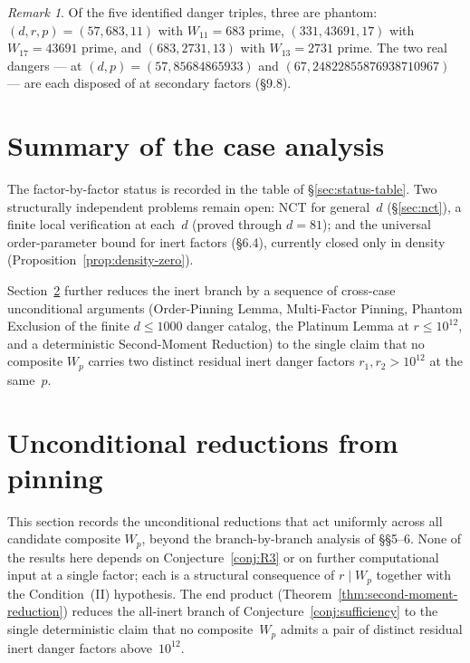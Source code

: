 \documentclass[12pt]{article}
\theoremstyle{plain}
\theoremstyle{definition}
\theoremstyle{remark}
\newtheorem{remark}[theorem]{Remark}
\begin{document}
\begin{remark}\label{rem:phantom-structure}
Of the five identified danger triples, three are phantom:
\((d, r, p) = (57, 683, 11)\) with \(W_{11} = 683\) prime,
\((331, 43691, 17)\) with \(W_{17} = 43691\) prime, and
\((683, 2731, 13)\) with \(W_{13} = 2731\) prime. The two real
dangers --- at \((d, p) = (57, 85684865933)\) and
\((67, 24822855876938710967)\) --- are each disposed of at
secondary factors (\S9.8).
\end{remark}


\section{Summary of the case analysis}


The factor-by-factor status is recorded in the table of
\S\ref{sec:status-table}. Two structurally independent problems
remain open: NCT for general~\(d\) (\S\ref{sec:nct}), a finite
local verification at each~\(d\) (proved through \(d = 81\));
and the universal order-parameter bound for inert factors
(\S6.4), currently closed only in density
(Proposition~\ref{prop:density-zero}).

Section~\ref{sec:pinning-reductions} further reduces the inert
branch by a sequence of cross-case unconditional arguments
(Order-Pinning Lemma, Multi-Factor Pinning, Phantom Exclusion of
the finite \(d \leq 1000\) danger catalog, the Platinum Lemma at
\(r \leq 10^{12}\), and a deterministic Second-Moment Reduction)
to the single claim that no composite \(W_p\) carries two
distinct residual inert danger factors \(r_1, r_2 > 10^{12}\) at
the same~\(p\).



\section{Unconditional reductions from pinning}\label{sec:pinning-reductions}

This section records the unconditional reductions that act
uniformly across all candidate composite \(W_p\), beyond the
branch-by-branch analysis of \S\S5--6. None of the results here
depends on Conjecture~\ref{conj:R3} or on further computational
input at a single factor; each is a structural consequence of
\(r \mid W_p\) together with the Condition~(II) hypothesis. The
end product (Theorem~\ref{thm:second-moment-reduction}) reduces
the all-inert branch of Conjecture~\ref{conj:sufficiency} to the
single deterministic claim that no composite~\(W_p\) admits a
pair of distinct residual inert danger factors above~\(10^{12}\).
\end{document}
